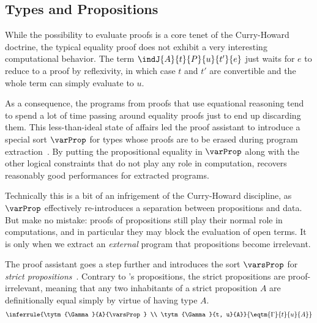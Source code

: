 \subsection{Types and Propositions}

While the possibility to evaluate proofs is a core tenet of the Curry-Howard
doctrine, the typical equality proof does not exhibit a very interesting 
computational behavior. 
% 
The term \( \indJ{A}{t}{P}{u}{t'}{e} \) just waits for \( e \) to reduce to
a proof by reflexivity, in which case \( t \) and \( t' \) are convertible and
the whole term can simply evaluate to \( u \). 

As a consequence, the programs 
from proofs that use equational reasoning  tend to spend a lot of time passing 
around equality proofs just to end up discarding them.
% 
This less-than-ideal state of affairs led the \Coq proof assistant to introduce
a special sort \( \varProp \) for types whose proofs are to be erased during 
program extraction~.
% 
By putting the propositional equality in \( \varProp \) along with the other logical 
constraints that do not play any role in computation, \Coq recovers reasonably good 
performances for extracted programs. 

Technically this is a bit of an infrigement of the Curry-Howard discipline, as \( \varProp \) 
effectively re-introduces a separation between propositions and data.
% 
But make no mistake: proofs of propositions still play their normal role in computations, and in 
particular they may block the evaluation of open terms. 
% 
It is only when we extract an \emph{external} program that propositions become irrelevant.

The \Lean proof assistant goes a step further and introduces the sort 
% 
% 
\( \varsProp \) for \emph{strict propositions}~.
% 
% 
Contrary to \Coq's propositions, the strict propositions are proof-irrelevant, 
meaning that any two inhabitants of a strict proposition \( A \) are 
definitionally equal simply by virtue of having type \( A \).
% 
\[
\inferrule{\tytm{\Gamma}{A}{\varsProp} \\ \tytm{\Gamma}{t, u}{A}}{\eqtm{\Gamma}{t}{u}{A}}
\]

